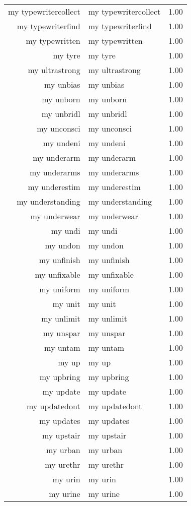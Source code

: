 \begin{table}[ht]
\begin{tabular}{rlr}
  my typewritercollect & my typewritercollect & 1.00 \\ 
  my typewriterfind & my typewriterfind & 1.00 \\ 
  my typewritten & my typewritten & 1.00 \\ 
  my tyre & my tyre & 1.00 \\ 
  my ultrastrong & my ultrastrong & 1.00 \\ 
  my unbias & my unbias & 1.00 \\ 
  my unborn & my unborn & 1.00 \\ 
  my unbridl & my unbridl & 1.00 \\ 
  my unconsci & my unconsci & 1.00 \\ 
  my undeni & my undeni & 1.00 \\ 
  my underarm & my underarm & 1.00 \\ 
  my underarms & my underarms & 1.00 \\ 
  my underestim & my underestim & 1.00 \\ 
  my understanding & my understanding & 1.00 \\ 
  my underwear & my underwear & 1.00 \\ 
  my undi & my undi & 1.00 \\ 
  my undon & my undon & 1.00 \\ 
  my unfinish & my unfinish & 1.00 \\ 
  my unfixable & my unfixable & 1.00 \\ 
  my uniform & my uniform & 1.00 \\ 
  my unit & my unit & 1.00 \\ 
  my unlimit & my unlimit & 1.00 \\ 
  my unspar & my unspar & 1.00 \\ 
  my untam & my untam & 1.00 \\ 
  my up & my up & 1.00 \\ 
  my upbring & my upbring & 1.00 \\ 
  my update & my update & 1.00 \\ 
  my updatedont & my updatedont & 1.00 \\ 
  my updates & my updates & 1.00 \\ 
  my upstair & my upstair & 1.00 \\ 
  my urban & my urban & 1.00 \\ 
  my urethr & my urethr & 1.00 \\ 
  my urin & my urin & 1.00 \\ 
  my urine & my urine & 1.00 \\ 

\end{tabular}
\end{table}
